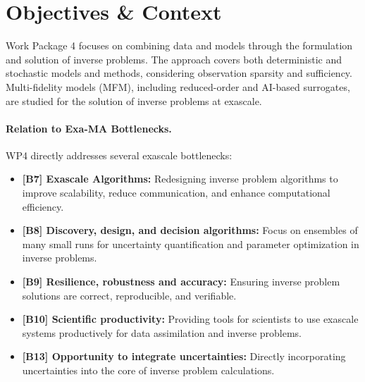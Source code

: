 
\section{Objectives \& Context}
\label{sec:wp4:objectives}

Work Package 4 focuses on combining data and models through the formulation and solution of inverse problems. 
The approach covers both deterministic and stochastic models and methods, considering observation sparsity and sufficiency. 
Multi-fidelity models (MFM), including reduced-order and AI-based surrogates, are studied for the solution of inverse problems at exascale.

\paragraph{Relation to Exa-MA Bottlenecks.}
WP4 directly addresses several exascale bottlenecks:
\begin{itemize}
\item \textbf{[B7] Exascale Algorithms:} Redesigning inverse problem algorithms to improve scalability, reduce communication, and enhance computational efficiency.
\item \textbf{[B8] Discovery, design, and decision algorithms:} Focus on ensembles of many small runs for uncertainty quantification and parameter optimization in inverse problems.
\item \textbf{[B9] Resilience, robustness and accuracy:} Ensuring inverse problem solutions are correct, reproducible, and verifiable.
\item \textbf{[B10] Scientific productivity:} Providing tools for scientists to use exascale systems productively for data assimilation and inverse problems.
\item \textbf{[B13] Opportunity to integrate uncertainties:} Directly incorporating uncertainties into the core of inverse problem calculations.
\end{itemize}

